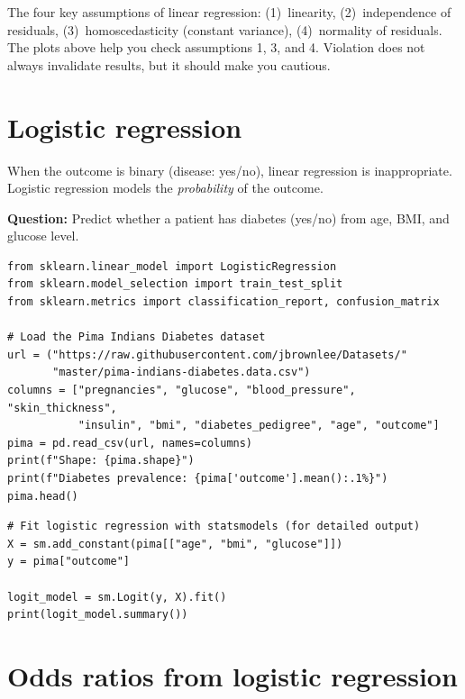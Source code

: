 \begin{clinicalnote}
The four key assumptions of linear regression: (1)~linearity, (2)~independence of residuals, (3)~homoscedasticity (constant variance), (4)~normality of residuals. The plots above help you check assumptions 1, 3, and 4. Violation does not always invalidate results, but it should make you cautious.
\end{clinicalnote}

\section{Logistic regression}

When the outcome is binary (disease: yes/no), linear regression is inappropriate. Logistic regression models the \emph{probability} of the outcome.

\textbf{Question:} Predict whether a patient has diabetes (yes/no) from age, BMI, and glucose level.

\begin{verbatim}
from sklearn.linear_model import LogisticRegression
from sklearn.model_selection import train_test_split
from sklearn.metrics import classification_report, confusion_matrix

# Load the Pima Indians Diabetes dataset
url = ("https://raw.githubusercontent.com/jbrownlee/Datasets/"
       "master/pima-indians-diabetes.data.csv")
columns = ["pregnancies", "glucose", "blood_pressure", "skin_thickness",
           "insulin", "bmi", "diabetes_pedigree", "age", "outcome"]
pima = pd.read_csv(url, names=columns)
print(f"Shape: {pima.shape}")
print(f"Diabetes prevalence: {pima['outcome'].mean():.1%}")
pima.head()
\end{verbatim}

\begin{verbatim}
# Fit logistic regression with statsmodels (for detailed output)
X = sm.add_constant(pima[["age", "bmi", "glucose"]])
y = pima["outcome"]

logit_model = sm.Logit(y, X).fit()
print(logit_model.summary())
\end{verbatim}

\section{Odds ratios from logistic regression}

